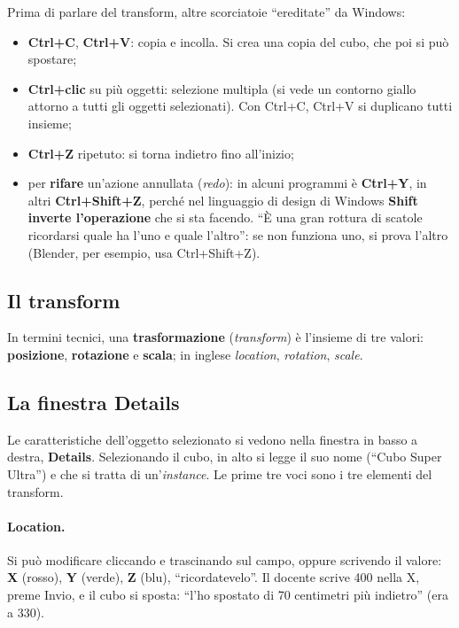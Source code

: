 Prima di parlare del transform, altre scorciatoie ``ereditate'' da Windows:
\begin{itemize}
  \item \textbf{Ctrl+C}, \textbf{Ctrl+V}: copia e incolla. Si crea una copia
        del cubo, che poi si può spostare;
  \item \textbf{Ctrl+clic} su più oggetti: selezione multipla (si vede un
        contorno giallo attorno a tutti gli oggetti selezionati). Con Ctrl+C,
        Ctrl+V si duplicano tutti insieme;
  \item \textbf{Ctrl+Z} ripetuto: si torna indietro fino all'inizio;
  \item per \textbf{rifare} un'azione annullata (\emph{redo}): in alcuni
        programmi è \textbf{Ctrl+Y}, in altri \textbf{Ctrl+Shift+Z}, perché
        nel linguaggio di design di Windows \textbf{Shift inverte
        l'operazione} che si sta facendo. ``È una gran rottura di scatole
        ricordarsi quale ha l'uno e quale l'altro'': se non funziona uno, si
        prova l'altro (Blender, per esempio, usa Ctrl+Shift+Z).
\end{itemize}

\subsection{Il transform}

In termini tecnici, una \textbf{trasformazione} (\emph{transform}) è
l'insieme di tre valori: \textbf{posizione}, \textbf{rotazione} e
\textbf{scala}; in inglese \emph{location}, \emph{rotation}, \emph{scale}.

\subsection{La finestra Details}

Le caratteristiche dell'oggetto selezionato si vedono nella finestra in basso a
destra, \textbf{Details}. Selezionando il cubo, in alto si legge il suo nome
(``Cubo Super Ultra'') e che si tratta di un'\emph{instance}. Le prime tre voci
sono i tre elementi del transform.

\paragraph{Location.} Si può modificare cliccando e trascinando sul campo,
oppure scrivendo il valore: \textbf{X} (rosso), \textbf{Y} (verde),
\textbf{Z} (blu), ``ricordatevelo''. Il docente scrive 400 nella X, preme
Invio, e il cubo si sposta: ``l'ho spostato di 70 centimetri più indietro''
(era a 330).

